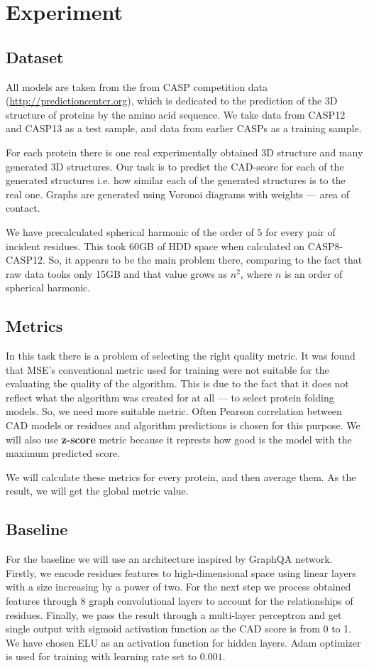 \documentclass[12pt,twoside]{article}
\begin{document}
	\section{Experiment}
	\subsection{Dataset}
	All models are taken from the from CASP competition data (\url{http://predictioncenter.org}), which is dedicated to the prediction 
	of the 3D structure of proteins by the amino acid sequence. We take data from CASP12 and CASP13 as a test sample, and data from
	earlier CASPs as a training sample.

	For each protein there is one real experimentally obtained 3D structure and many generated 3D structures. Our task is to predict 
	the CAD-score \cite{Olechnovic2012} for each of the generated structures i.e. how similar each of the generated structures is to the real one.
	Graphs are generated using Voronoi diagrams with weights — area of contact.

	We have precalculated spherical harmonic of the order of $5$ for every pair of incident residues. This took 60GB of HDD space when
	calculated on CASP8-CASP12. So, it appears to be the main problem there, comparing to the fact that raw data tooks only
	15GB and that value grows as $n^2$, where $n$ is an order of spherical harmonic.

	\subsection{Metrics}
	In this task there is a problem of selecting the right quality metric. It was found that MSE's conventional metric used
	for training were not suitable for the evaluating the quality of the algorithm. This is due to the fact that it does not 
	reflect what the algorithm was created for at all — to select protein folding models. So, we need more suitable metric.
	Often Pearson correlation between CAD models or residues and algorithm predictions is chosen for this purpose\cite{Baldassarre2020GRAPHQAPM}.
	We will also use \textbf{z-score} metric because it represts how good is the model with the
	maximum predicted score.

	We will calculate these metrics for every protein, and then average them. As the result, we will get the global metric value.

	\subsection{Baseline}
	For the baseline we will use an architecture inspired by GraphQA\cite{Baldassarre2020GRAPHQAPM} network. Firstly, we encode residues features
	to high-dimensional space using linear layers with a size increasing by a power of two. For the next step we process obtained features through
	8 graph convolutional layers to account for the relationships of residues. Finally, we pass the result through a multi-layer perceptron and get
	single output with sigmoid activation function as the CAD score is from 0 to 1. We have chosen ELU as an activation function for hidden layers.
	Adam optimizer\cite{Kingma2014} is used for training with learning rate set to $0.001$.
\end{document}
